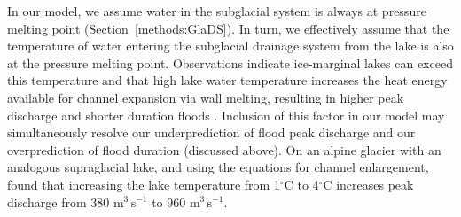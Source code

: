 \documentclass[tc, manuscript]{copernicus}
\begin{document}
In our model, we assume water in the subglacial system is always at pressure melting point (Section~\ref{methods:GlaDS}). In turn, we effectively assume that the temperature of water entering the subglacial drainage system from the lake is also at the pressure melting point. Observations indicate ice-marginal lakes can exceed this temperature \citep[e.g.,][]{clarke2003hydraulics,ng2007climatic,carrivick2017ice} and that high lake water temperature increases the heat energy available for channel expansion via wall melting, resulting in higher peak discharge and shorter duration floods \citep[see Fig. 6A in][]{carrivick2017ice}. Inclusion of this factor in our model may simultaneously resolve our underprediction of flood peak discharge and our overprediction of flood duration (discussed above). On an alpine glacier with an analogous supraglacial lake, and using the \citet{spring1981numerical} equations for channel enlargement, \citet{werder2010hazard} found that increasing the lake temperature from 1$^{\circ}$C to 4$^{\circ}$C increases peak discharge from 380 $\mathrm{m}^3 \, \mathrm{s}^{-1}$ to 960 $\mathrm{m}^3 \, \mathrm{s}^{-1}$. 
\end{document}
